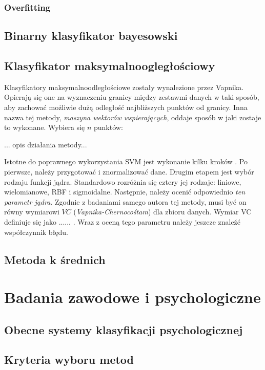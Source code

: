 \documentclass[12pt,a4paper,oneside]{report} %
\begin{document}
\subsection{Overfitting}
\section{Binarny klasyfikator bayesowski}
\section{Klasyfikator maksymalnoogległościowy}
Klasyfikatory maksymalnoodległościowe zostały wynalezione przez Vapnika. Opierają się one na wyznaczeniu granicy między zestawmi danych w taki sposób, aby zachować możliwie dużą odległość najbliższych punktów od granicy. Inna nazwa tej metody, \emph{maszyna wektorów wspierających}, oddaje sposób w jaki zostaje to wykonane. Wybiera się $n$ punktów:\par
    ... opis działania metody...\par
Istotne do poprawnego wykorzystania SVM jest wykonanie kilku kroków \cite{chih-wei}. Po pierwsze, należy przygotować i znormalizować dane. Drugim etapem jest wybór rodzaju funkcji jądra. Standardowo rozróżnia się cztery jej rodzaje: liniowe, wielomianowe, RBF i sigmoidalne. Następnie, należy ocenić odpowiednio \emph{ten parametr jądra}. Zgodnie z badaniami samego autora tej metody, musi być on równy wymiarowi $VC$ (\emph{Vapnika-Chernocośtam}) dla zbioru danych. Wymiar VC definiuje się jako ...... . Wraz z oceną tego parametru należy jeszcze znaleźć współczynnik błędu. \par
\section{Metoda k średnich}
\chapter{Badania zawodowe i psychologiczne}
\section{Obecne systemy klasyfikacji psychologicznej}
\section{Kryteria wyboru metod}
\end{document}
